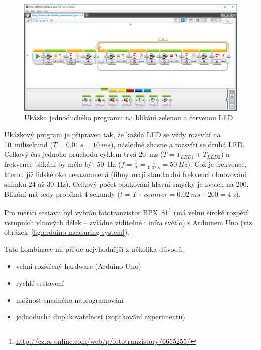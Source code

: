 \begin{figure}[h]
	\centering
	\includegraphics[width=\textwidth]{images/measuring-ev3-software_LoopTimeLEDblinking.png}
	\caption[Ukázka jednoduchého programu na blikání zelenou a červenou LED]{Ukázka jednoduchého programu na blikání zelenou a červenou LED}
	\label{fig:LoopTimeLEDblinking-measuring}
\end{figure}

Ukázkový program je připraven tak, že každá LED se vždy rozsvítí na 10~milisekund ($T = 0.01~s = 10~ms$), následně zhasne a rozsvítí se druhá LED.  
Celkový čas jednoho průchodu cyklem trvá 20~ms ($T = T_{LED1} + T_{LED2}$) a frekvence blikání by měla být 50~Hz ($f = \frac{1}{T} = \frac{1}{0.02~s} = 50~Hz$). 
Což je frekvence, kterou již lidské oko nezaznamená (filmy mají standardní frekvenci obnovování snímku 24 až 30~Hz). %
Celkový počet opakování hlavní smyčky je zvolen na 200. 
Blikání má tedy probíhat 4 sekundy ($t = T~\cdot~counter = 0.02~ms~\cdot~200 = 4~s$).

Pro měřící sestavu byl vybrán fototranzistor BPX~81\footnote{\url{http://cz.rs-online.com/web/p/fototranzistory/6655255/}} (má velmi široké rozpětí vstupních vlnových délek -- zvládne viditelné i infra světlo) s Arduinem Uno (viz obrázek~\ref{fig:arduino-measuring-system}). 

Tato kombinace mi přijde nejvhodnější z několika důvodů: 

\begin{itemize}
	\item velmi rozšířený hardware (Arduino Uno)
	\item rychlé sestavení
	\item možnost snadného naprogramování
	\item jednoduchá duplikovatelnost (zopakování experimentu)
\end{itemize}  


